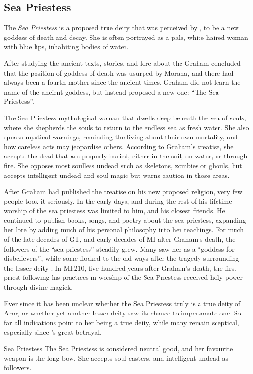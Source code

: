 \subsection{Sea Priestess}
\label{sec:Sea Priestess}

The \emph{Sea Priestess} is a proposed true deity that was perceived by
, to be a new goddess of death and decay. She is
often portrayed as a pale, white haired woman with blue lips, inhabiting
bodies of water.

After studying the ancient texts, stories, and lore about the  Graham concluded that the position of goddess of death was usurped by
Morana, and there had always been a fourth mother since the ancient times.
Graham did not learn the name of the ancient goddess, but instead proposed a
new one: ``The Sea Priestess''.

The Sea Priestess mythological woman that dwells deep beneath the
\hyperref[sec:Soul Well]{sea of souls}, where she shepherds the souls to
return to the endless sea as fresh water. She also speaks mystical warnings,
reminding the living about their own mortality, and how careless acts may
jeopardise others. According to Graham's treatise, she accepts the dead that
are properly buried, either in the soil, on water, or through fire. She
opposes most soulless undead such as skeletons, zombies or ghouls, but accepts
intelligent undead and soul magic but warns caution in those areas.

After Graham had published the treatise on his new proposed religion, very
few people took it seriously. In the early days, and during the rest of his
lifetime worship of the sea priestess was limited to him, and his closest
friends. He continued to publish books, songs, and poetry about the sea
priestess, expanding her lore by adding much of his personal philosophy into
her teachings. For much of the late decades of GT, and early decades of MI
after Graham's death, the followers of the ``sea priestess'' steadily grew.
Many saw her as a ``goddess for disbelievers'', while some flocked to the old
ways after the tragedy surrounding the lesser deity .
In MI:210, five hundred years after Graham's death, the first priest following
his practices in worship of the Sea Priestess received holy power through
divine magick.

Ever since it has been unclear whether the Sea Priestess truly is a true deity
of Aror, or whether yet another lesser deity saw its chance to impersonate
one. So far all indications point to her being a true deity, while many remain
sceptical, especially since 's great betrayal.

\begin{35e}{Sea Priestess}
  The Sea Priestess is considered neutral good, and her favourite weapon is
  the long bow. She accepts soul casters, and intelligent undead as followers.
\end{35e}

